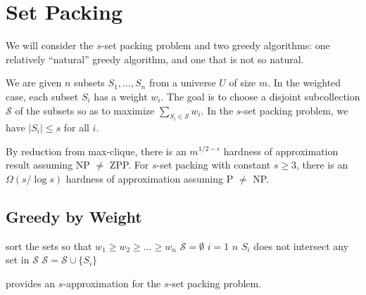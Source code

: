 
\usepackage{vwcol}



\section{Set Packing}

We will consider the $s$-set packing problem and two greedy algorithms: one relatively ``natural'' greedy algorithm, and one that is not so natural.

\begin{problem}
    We are given $n$ subsets $S_1,\ldots,S_n$ from a universe $U$ of size $m$. In the weighted case, each subset $S_i$ has a weight $w_i$. The goal is to choose a disjoint subcollection $\mathcal{S}$ of the subsets so as to maximize $\sum_{S_i \in \mathcal{S}} w_i$. In the $s$-set packing problem, we have $|S_i| \leq s$ for all $i$.
\end{problem}

By reduction from max-clique, there is an $m^{1/2 - \epsilon}$ hardness of approximation result assuming NP $\neq$ ZPP. For $s$-set packing with constant $s \geq 3$, there is an $\Omega(s / \log s)$ hardness of approximation assuming P $\neq$ NP.

\subsection{Greedy by Weight}

\begin{codebox}
    \li sort the sets so that $w_1 \geq w_2 \geq \ldots \geq w_n$
    \li $\mathcal{S} = \emptyset$
    \li \For $i = 1$ \To $n$ \Do
        \li \If $S_i$ does not intersect any set in $\mathcal{S}$ \Then
            \li $\mathcal{S} = \mathcal{S} \cup \{S_i\}$  
\end{codebox}

\begin{theorem} \label{thm:set-packing-ratio}
     provides an $s$-approximation for the $s$-set packing problem.
\end{theorem}

